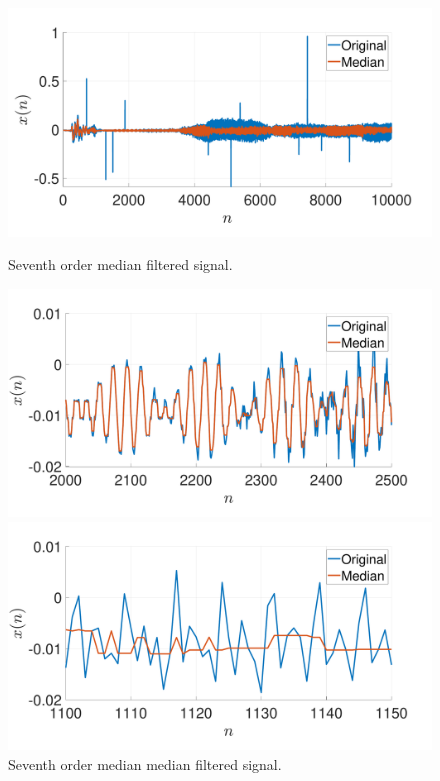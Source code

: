 \documentclass[a4paper, oneside, 11pt]{article}
\begin{document}
\begin{figure}[htbp]
	\begin{minipage}[b]{.49\textwidth}
		\centering
		\includegraphics[width= 1.1\textwidth]{figures/comp_median7_zoom_out.pdf}
		\caption{Seventh order median filtered signal.}
		\label{fig:comp_median7_zoom_out}
	\end{minipage}
	\hfill
	\begin{minipage}[b]{.49\textwidth}
		\centering
		\includegraphics[width= 1.1\textwidth]{figures/comp_median7_zoom_med.pdf}
		\caption{Seventh order median median filtered signal.}
		\label{fig:comp_median7_zoom_med}
	\end{minipage}
	\begin{minipage}[b]{.49\textwidth}
		\centering
		\includegraphics[width= 1.1\textwidth]{figures/comp_median7_zoom_in.pdf}

\end{minipage}
\end{figure}
\end{document}
